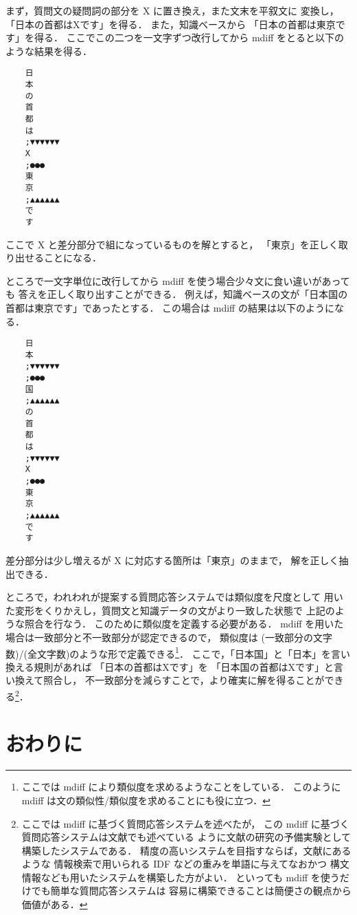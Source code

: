 まず，質問文の疑問詞の部分を X に置き換え，また文末を平叙文に
変換し，「日本の首都はXです」を得る．
また，知識ベースから
「日本の首都は東京です」を得る．
ここでこの二つを一文字ずつ改行してから
 mdiff をとると以下のような結果を得る．
\begin{verbatim}
    日
    本
    の
    首
    都
    は
    ;▼▼▼▼▼▼
    X
    ;●●●
    東
    京
    ;▲▲▲▲▲▲
    で
    す
\end{verbatim}
ここで X と差分部分で組になっているものを解とすると，
「東京」を正しく取り出せることになる．

ところで一文字単位に改行してから mdiff を使う場合少々文に食い違いがあっても
答えを正しく取り出すことができる．
例えば，知識ベースの文が「日本国の首都は東京です」であったとする．
この場合は mdiff の結果は以下のようになる．
\begin{verbatim}
    日
    本
    ;▼▼▼▼▼▼
    ;●●●
    国
    ;▲▲▲▲▲▲
    の
    首
    都
    は
    ;▼▼▼▼▼▼
    X
    ;●●●
    東
    京
    ;▲▲▲▲▲▲
    で
    す
\end{verbatim}
差分部分は少し増えるが X に対応する箇所は「東京」のままで，
解を正しく抽出できる．

ところで，われわれが提案する質問応答システムでは類似度を尺度として
用いた変形をくりかえし，質問文と知識データの文がより一致した状態で
上記のような照合を行なう．
このために類似度を定義する必要がある．
mdiff を用いた場合は一致部分と不一致部分が認定できるので，
類似度は
(一致部分の文字数)/(全文字数)のような形で定義できる\footnote{ここでは
mdiff により類似度を求めるようなことをしている．
このように mdiff は文の類似性/類似度を求めることにも役に立つ．}．
ここで，「日本国」と「日本」を言い換える規則があれば
「日本の首都はXです」を
「日本国の首都はXです」と言い換えて照合し，
不一致部分を減らすことで，より確実に解を得ることができる\footnote{\label{fn:qa}ここでは
mdiff に基づく質問応答システムを述べたが，
この mdiff に基づく質問応答システムは文献\cite{murata_nlp2001ws_true}でも述べている
ように文献\cite{murata2000_1_nl}の研究の予備実験として構築したシステムである．
精度の高いシステムを目指すならば，文献\cite{murata2000_1_nl}にあるような
情報検索\cite{murata_irex_ir_nlp}で用いられる IDF などの重みを単語に与えてなおかつ
構文情報なども用いたシステム\cite{qa_memo}を構築した方がよい．
といっても mdiff を使うだけでも簡単な質問応答システムは
容易に構築できることは簡便さの観点から価値がある．}．

\section{おわりに}

